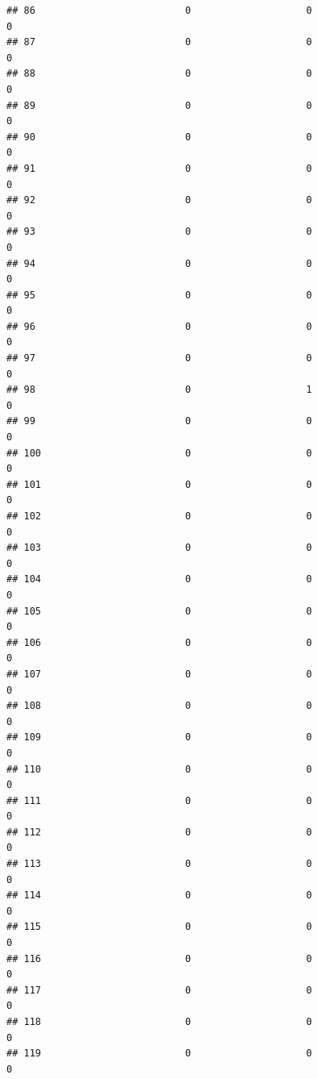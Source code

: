 \documentclass[
]{article}
\begin{document}
\begin{verbatim}
## 86                          0                    0                      0
## 87                          0                    0                      0
## 88                          0                    0                      0
## 89                          0                    0                      0
## 90                          0                    0                      0
## 91                          0                    0                      0
## 92                          0                    0                      0
## 93                          0                    0                      0
## 94                          0                    0                      0
## 95                          0                    0                      0
## 96                          0                    0                      0
## 97                          0                    0                      0
## 98                          0                    1                      0
## 99                          0                    0                      0
## 100                         0                    0                      0
## 101                         0                    0                      0
## 102                         0                    0                      0
## 103                         0                    0                      0
## 104                         0                    0                      0
## 105                         0                    0                      0
## 106                         0                    0                      0
## 107                         0                    0                      0
## 108                         0                    0                      0
## 109                         0                    0                      0
## 110                         0                    0                      0
## 111                         0                    0                      0
## 112                         0                    0                      0
## 113                         0                    0                      0
## 114                         0                    0                      0
## 115                         0                    0                      0
## 116                         0                    0                      0
## 117                         0                    0                      0
## 118                         0                    0                      0
## 119                         0                    0                      0

\end{verbatim}
\end{document}
